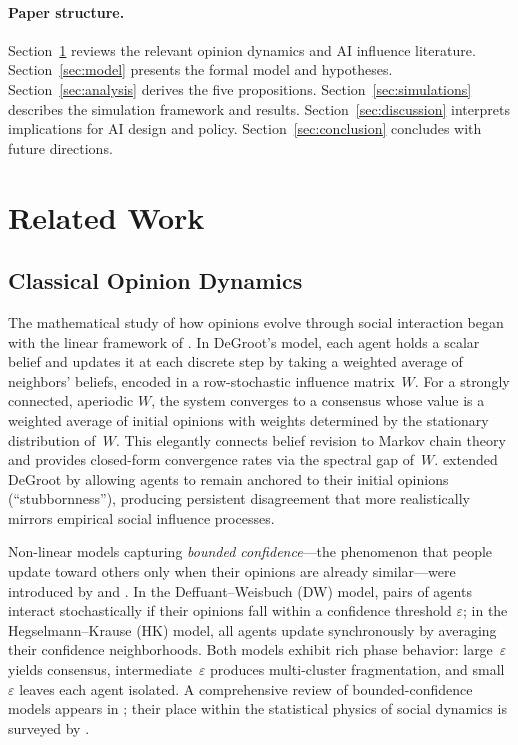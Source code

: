 \documentclass{article}
\theoremstyle{plain}
\theoremstyle{definition}
\theoremstyle{remark}
\begin{document}
\paragraph{Paper structure.}
Section~\ref{sec:related} reviews the relevant opinion dynamics and AI
influence literature.
Section~\ref{sec:model} presents the formal model and hypotheses.
Section~\ref{sec:analysis} derives the five propositions.
Section~\ref{sec:simulations} describes the simulation framework and
results.
Section~\ref{sec:discussion} interprets implications for AI design and
policy.
Section~\ref{sec:conclusion} concludes with future directions.

\section{Related Work}
\label{sec:related}

\subsection{Classical Opinion Dynamics}

The mathematical study of how opinions evolve through social interaction
began with the linear framework of \citet{degroot1974}.
In DeGroot's model, each agent holds a scalar belief and updates it at
each discrete step by taking a weighted average of neighbors' beliefs,
encoded in a row-stochastic influence matrix~$W$.
For a strongly connected, aperiodic $W$, the system converges to a
consensus whose value is a weighted average of initial opinions with
weights determined by the stationary distribution of~$W$.
This elegantly connects belief revision to Markov chain theory and
provides closed-form convergence rates via the spectral gap of~$W$.
\citet{friedkin1990} extended DeGroot by allowing agents to remain
anchored to their initial opinions (``stubbornness''), producing persistent
disagreement that more realistically mirrors empirical social influence
processes.

Non-linear models capturing \emph{bounded confidence}---the phenomenon
that people update toward others only when their opinions are already
similar---were introduced by \citet{deffuant2000} and \citet{hegselmann2002}.
In the Deffuant--Weisbuch (DW) model, pairs of agents interact
stochastically if their opinions fall within a confidence threshold
$\varepsilon$; in the Hegselmann--Krause (HK) model, all agents update
synchronously by averaging their confidence neighborhoods.
Both models exhibit rich phase behavior: large~$\varepsilon$ yields
consensus, intermediate~$\varepsilon$ produces multi-cluster fragmentation,
and small~$\varepsilon$ leaves each agent isolated.
A comprehensive review of bounded-confidence models appears in
\citet{bernardo2024}; their place within the statistical physics of
social dynamics is surveyed by \citet{castellano2009}.
\end{document}
